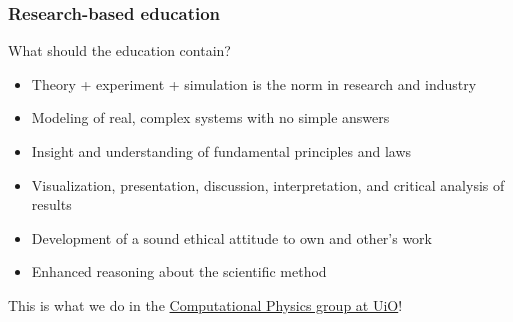 \documentclass{beamer}
\begin{document}
\begin{frame}
\frametitle{Research-based education}

\begin{block}{What should the education contain? }

\begin{itemize}
\item Theory + experiment + simulation is the norm in research and industry

\item Modeling of real, complex systems with no simple answers

\item Insight and understanding of fundamental principles and laws

\item Visualization, presentation, discussion, interpretation, and critical analysis of results

\item Development of a sound ethical attitude to own and other's work

\item Enhanced reasoning about the scientific method
\end{itemize}

\noindent
This is what we do in the \href{{http://www.mn.uio.no/fysikk/english/research/groups/computational/index.html}}{Computational Physics group at UiO}!
\end{block}
\end{frame}
\end{document}
